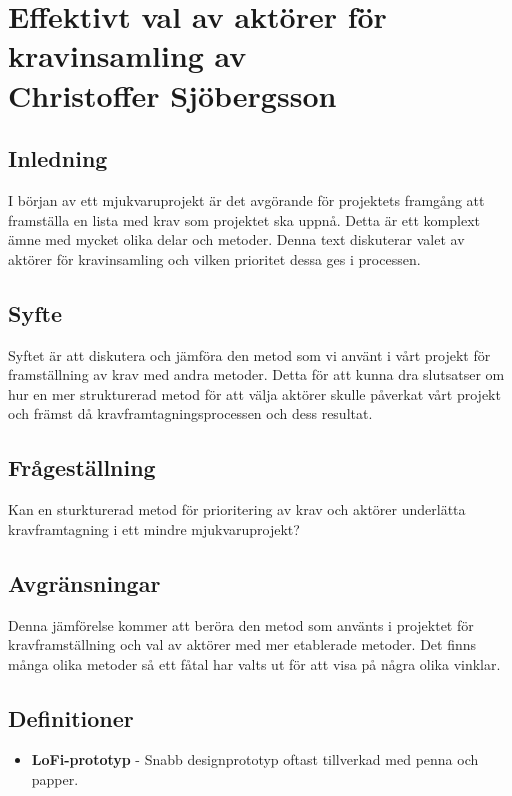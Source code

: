 \chapter{Effektivt val av aktörer för \\kravinsamling av \\ Christoffer Sjöbergsson}

\section{Inledning}
I början av ett mjukvaruprojekt är det avgörande för projektets framgång att framställa en lista med krav som projektet ska uppnå. Detta är ett komplext ämne med mycket olika delar och metoder. Denna text diskuterar valet av aktörer för kravinsamling och vilken prioritet dessa ges i processen.

\section{Syfte}
Syftet är att diskutera och jämföra den metod som vi använt i vårt projekt för framställning av krav med andra metoder. Detta för att kunna dra slutsatser om hur en mer strukturerad metod för att välja aktörer skulle påverkat vårt projekt och främst då kravframtagningsprocessen och dess resultat.

\section{Frågeställning}
Kan en sturkturerad metod för prioritering av krav och aktörer underlätta kravframtagning i ett mindre mjukvaruprojekt?

\section{Avgränsningar}
Denna jämförelse kommer att beröra den metod som använts i projektet för kravframställning och val av aktörer med mer etablerade metoder. Det finns många olika metoder så ett fåtal har valts ut för att visa på några olika vinklar.

\section{Definitioner}
\begin{itemize}
	\item \textbf{LoFi-prototyp} - Snabb designprototyp oftast tillverkad med penna och papper.
\end{itemize}


